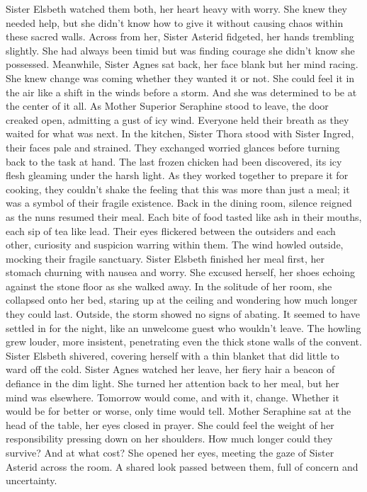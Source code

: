 \documentclass[11pt]{article}
\begin{document}
Sister Elsbeth watched them both, her heart heavy with worry. She knew they needed help, but she didn't know how to give it without causing chaos within these sacred walls. Across from her, Sister Asterid fidgeted, her hands trembling slightly. She had always been timid but was finding courage she didn't know she possessed.
Meanwhile, Sister Agnes sat back, her face blank but her mind racing. She knew change was coming whether they wanted it or not. She could feel it in the air like a shift in the winds before a storm. And she was determined to be at the center of it all.
As Mother Superior Seraphine stood to leave, the door creaked open, admitting a gust of icy wind. Everyone held their breath as they waited for what was next.
In the kitchen, Sister Thora stood with Sister Ingred, their faces pale and strained. They exchanged worried glances before turning back to the task at hand. The last frozen chicken had been discovered, its icy flesh gleaming under the harsh light. As they worked together to prepare it for cooking, they couldn't shake the feeling that this was more than just a meal; it was a symbol of their fragile existence.
Back in the dining room, silence reigned as the nuns resumed their meal. Each bite of food tasted like ash in their mouths, each sip of tea like lead. Their eyes flickered between the outsiders and each other, curiosity and suspicion warring within them. The wind howled outside, mocking their fragile sanctuary.
Sister Elsbeth finished her meal first, her stomach churning with nausea and worry. She excused herself, her shoes echoing against the stone floor as she walked away. In the solitude of her room, she collapsed onto her bed, staring up at the ceiling and wondering how much longer they could last.
Outside, the storm showed no signs of abating. It seemed to have settled in for the night, like an unwelcome guest who wouldn't leave. The howling grew louder, more insistent, penetrating even the thick stone walls of the convent. Sister Elsbeth shivered, covering herself with a thin blanket that did little to ward off the cold.
Sister Agnes watched her leave, her fiery hair a beacon of defiance in the dim light. She turned her attention back to her meal, but her mind was elsewhere. Tomorrow would come, and with it, change. Whether it would be for better or worse, only time would tell.
Mother Seraphine sat at the head of the table, her eyes closed in prayer. She could feel the weight of her responsibility pressing down on her shoulders. How much longer could they survive? And at what cost? She opened her eyes, meeting the gaze of Sister Asterid across the room. A shared look passed between them, full of concern and uncertainty.
\end{document}
